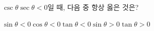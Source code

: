 $\csc\theta\sec\theta<0$일 때, 다음 중 항상 옳은 것은?
\begin{choices32}{$\sin\theta<0$}{$\cos\theta<0$}{$\tan\theta<0$}{$\sin\theta>0$}{$\tan\theta>0$}\end{choices32}
